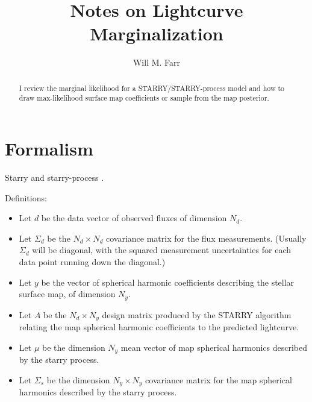 \documentclass[modern]{aastex631}
\begin{document}
\title{Notes on Lightcurve Marginalization}

\author[0000-0003-1540-8562]{Will M. Farr}

\begin{abstract}
    I review the marginal likelihood for a STARRY/STARRY-process model and how
    to draw max-likelihood surface map coefficients or sample from the map
    posterior.
\end{abstract}

\section{Formalism}
\label{sec:formalism}

Starry \citep{Luger2019} and starry-process \citep{Luger2021b}.

Definitions:
\begin{itemize}
    \item Let $d$ be the data vector of observed fluxes of dimension $N_d$.
    \item Let $\Sigma_d$ be the $N_d \times N_d$ covariance matrix for the flux
    measurements.  (Usually $\Sigma_d$ will be diagonal, with the squared
    measurement uncertainties for each data point running down the diagonal.)
    \item Let $y$ be the vector of spherical harmonic coefficients describing
    the stellar surface map, of dimension $N_y$.
    \item Let $A$ be the $N_d \times N_y$ design matrix produced by the STARRY
    algorithm relating the map spherical harmonic coefficients to the predicted
    lightcurve.
    \item Let $\mu$ be the dimension $N_y$ mean vector of map spherical
    harmonics described by the starry process.
    \item Let $\Sigma_s$ be the dimension $N_y \times N_y$ covariance matrix for
    the map spherical harmonics described by the starry process.
\end{itemize}
\end{document}
